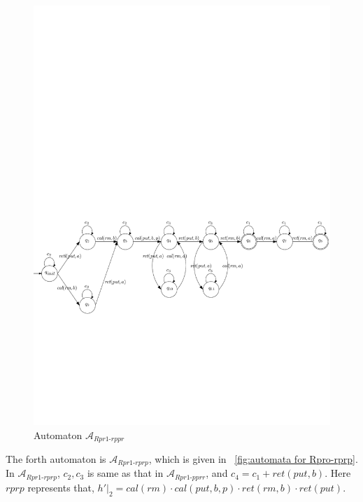\documentclass{llncs}
\begin{document}
\begin{figure}[htbp]
  \centering
  \includegraphics[width=1 \textwidth]{PIC_AUTO_UNMATCHED_Rpr1-rppr.pdf}
  \caption{Automaton $\mathcal{A}_{\textit{Rpr1-rppr}}$}
  \label{fig:automata for Rpro-rppr}
\end{figure}


The forth automaton is $\mathcal{A}_{\textit{Rpr1-rprp}}$, which is given in \figurename~\ref{fig:automata for Rpro-rprp}. In $\mathcal{A}_{\textit{Rpr1-rprp}}$, $c_2, c_3$ is same as that in $\mathcal{A}_{\textit{Rpr1-pprr}}$, and $c_4=c_1 + \textit{ret}(put,b)$. Here $\textit{rprp}$ represents that, $h' \vert_{2} = \textit{cal}(\textit{rm}) \cdot \textit{cal}(\textit{put},b,p) \cdot \textit{ret}(\textit{rm},b) \cdot \textit{ret}(\textit{put})$.
\end{document}
